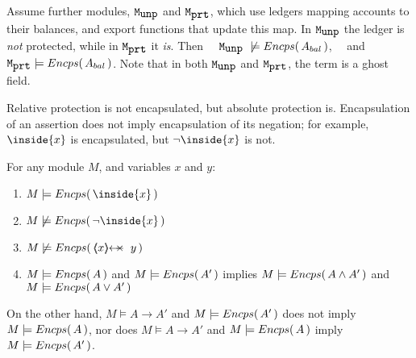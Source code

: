 \begin{example} Assume   further modules, $\mbox{\normalfont{\texttt{M}}}_{\mbox{\normalfont{\texttt{unp}}}}$ and $\mbox{\normalfont{\texttt{M}}}_{\mbox{\normalfont{\texttt{prt}}}}$,  which  use ledgers mapping  accounts to their balances, and export functions that update this map. In  $\mbox{\normalfont{\texttt{M}}}_{\mbox{\normalfont{\texttt{unp}}}}$ the ledger is \emph{not} protected, while in $\mbox{\normalfont{\texttt{M}}}_{\mbox{\normalfont{\texttt{prt}}}}$ it \emph{is}. 
Then  \ \ $\ModD \ \not\models\encaps{ A_{bal}} $, \ \  and \ \ $\mbox{\normalfont{\texttt{M}}}_{\mbox{\normalfont{\texttt{prt}}}}  \models {\ensuremath Encps(\,  A_{bal}\, )} $.
%
% 
\noindent
Note that in both $\mbox{\normalfont{\texttt{M}}}_{\mbox{\normalfont{\texttt{unp}}}}$ and $\mbox{\normalfont{\texttt{M}}}_{\mbox{\normalfont{\texttt{prt}}}}$, the term  is a ghost field. 
\end{example}

Relative protection %
is not encapsulated, but  absolute protection is.
Encapsulation of an assertion does not imply encapsulation of its negation; 
 for example,  ${\inside{x}}$ is encapsulated, %
 but $\neg  {\inside{x}}$ is not.


\begin{lemma}
For any module $M$, and variables $x$ and $y$:
\begin{enumerate} 
\item $M \models \encaps{\inside{x}}$
\item $M \not\models {\encaps{\neg\inside{x}}}$
\item $M \not\models {\encaps{\protectedFrom{x}{y}}}$
\item  $M \models  {\ensuremath Encps(\, A\, )}$ and $M \models  {\ensuremath Encps(\, A'\, )}$ implies 
$M \models  {\ensuremath Encps(\, A \wedge A'\, )}$ and $M \models  {\ensuremath Encps(\, A \vee A'\, )}$
\end{enumerate}
\end{lemma}

On the other hand,  $M \models A \rightarrow A'$ and $ M \models  {\ensuremath Encps(\, {A'}\, )}$ does not  imply \ $M \models  {\ensuremath Encps(\, A\, )}$, nor does
$M \models A \rightarrow A'$ and 
 $ M \models  {\ensuremath Encps(\, {A}\, )}$ imply \ $M \models  {\ensuremath Encps(\, A'\, )}$.

